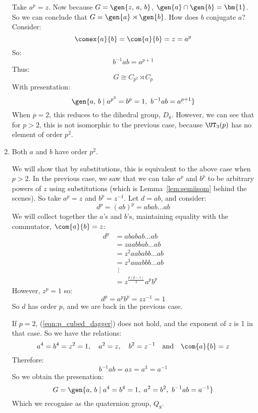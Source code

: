 \begin{enumerate}
        Take \(a^p = z\).
        Now because \(G = \gen{z,\,a,\,b}\), \(\gen{a} \cap \gen{b} = \bm{1}\).
        So we can conclude that \(G = \gen{a} \rtimes \gen{b}\).
        How does \(b\) conjugate \(a\)?
        Consider:
        \[\comex{a}{b} = \com{a}{b} = z = a^p\]
        So:
        \[b^{-1}ab = a^{p + 1}\]
        Thus:
        \[G \cong C_{p^2} \rtimes C_p\]
        With presentation:
        \[\gen{a,\,b \mid a^{p^2} = b^p = 1,\ b^{-1}ab = a^{p + 1}}\]
        When \(p = 2\), this reduces to the dihedral group, \(D_8\).
        However, we can see that for \(p > 2\), this is not isomorphic to the previous case, because \(\UT_3(p)\) has no
        element of order \(p^2\).
    \item Both \(a\) and \(b\) have order \(p^2\).

        We will show that by substitutions, this is equivalent to the above case when \(p > 2\).
        In the previous case, we saw that we can take \(a^p\) and \(b^p\) to be arbitrary powers of \(z\) using
        substitutions (which is Lemma~\ref{lem:semiisom} behind the scenes).
        So take \(a^p = z\) and \(b^p = z^{-1}\).
        Let \(d = ab\), and consider:
        \[ d^p = {(ab)}^p = abab\ldots ab\]
        We will collect together the \(a\)'s and \(b\)'s, maintaining equality with the commutator, \(\com{a}{b} = z\):
        \begin{align*}
            d^p &= ababab\ldots ab \\
            &= z aabbab\ldots ab \\
            &= z^2 aababb\ldots ab \\
            &= z^3 aaabbb\ldots ab \\
            &\ \,\vdots \\  %
            &= z^{\frac{p(p-1)}{2}} a^p b^p \tag{\(\dagger\)} \label{eqn:p_cubed_dagger}
        \end{align*}
        However, \(z^p = 1\) so:
        \[d^p = a^p b^p = zz^{-1} = 1\]
        So \(d\) has order \(p\), and we are back in the previous case.

        If \(p = 2\), (\ref{eqn:p_cubed_dagger}) does not hold, and the exponent of \(z\) is 1 in that case.
        So we have the relations:
        \[a^4 = b^4 = z^2 = 1, \quad a^2 = z, \quad b^2 = z^{-1} \quad \text{and} \quad \com{a}{b} = z\]
        Therefore:
        \[b^{-1}ab = az = a^3 = a^{-1}\]
        So we obtain the presenation:
        \[G = \gen{a,\,b \mid a^4 = b^4 = 1,\ a^2 = b^2,\ b^{-1}ab = a^{-1}}\]
        Which we recognise as the quaternion group, \(Q_8\).
\end{enumerate}


